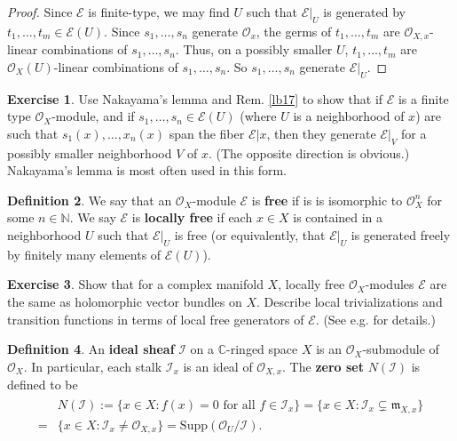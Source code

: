 \documentclass[12pt,b5paper,notitlepage]{report}
\theoremstyle{definition}
\newtheorem{df}{Definition}[section]
\newtheorem{exe}[df]{Exercise}
\theoremstyle{plain}
\newcommand{\fk}{\mathfrak}
\newcommand{\mc}{\mathcal}
\newcommand{\scr}{\mathscr}
\newcommand{\Cbb}{\mathbb C}
\newcommand{\Nbb}{\mathbb N}
\newcommand{\Supp}{\mathrm{Supp}}
\numberwithin{equation}{section}
\begin{document}
\begin{proof}
Since $\scr E$ is finite-type, we may find $U$ such that $\scr E|_U$ is generated by $t_1,\dots,t_m\in\scr E(U)$. Since $s_1,\dots,s_n$ generate $\scr O_x$, the germs of $t_1,\dots,t_m$ are $\scr O_{X,x}$-linear combinations of $s_1,\dots,s_n$. Thus, on a possibly smaller $U$, $t_1,\dots,t_m$ are $\scr O_X(U)$-linear combinations of $s_1,\dots,s_n$. So $s_1,\dots,s_n$ generate $\scr E|_U$.
\end{proof}










\begin{exe}
Use Nakayama's lemma and Rem. \ref{lb17} to show that if $\scr E$ is a finite type $\scr O_X$-module, and if $s_1,\dots,s_n\in\scr E(U)$ (where $U$ is a neighborhood of $x$) are such that $s_1(x),\dots,x_n(x)$ span the fiber $\scr E|x$, then they generate $\scr E|_V$ for a possibly smaller neighborhood $V$ of $x$. (The opposite direction is obvious.) Nakayama's lemma is most often used in this form.
\end{exe}



\begin{df}
We say that an $\scr O_X$-module $\scr E$ is \textbf{free} if is is isomorphic to $\scr O_X^n$ for some $n\in\Nbb$. We say $\scr E$ is \textbf{locally free} if each $x\in X$ is contained in a neighborhood $U$ such that $\scr E|_U$ is free (or equivalently, that $\scr E|_U$ is generated freely by finitely many elements of $\scr E(U)$).
\end{df}

\begin{exe}
Show that for a complex manifold $X$, locally free $\scr O_X$-modules $\scr E$ are the same as holomorphic vector bundles on $X$. Describe local trivializations and transition functions in terms of local free generators of $\scr E$. (See e.g. \cite[Sec. A]{Gui22} for details.)
\end{exe}


\begin{df}
An \textbf{ideal sheaf}  $\mc I$ on a $\Cbb$-ringed space $X$ is an $\scr O_X$-submodule of $\scr O_X$. In particular, each stalk $\mc I_x$ is an ideal of $\scr O_{X,x}$. The \textbf{zero set} $N(\mc I)$ \index{00@Zero set $N(\mc I)$} is defined to be
\begin{align}
\begin{aligned}\label{eq3}
&N(\mc I):=\{x\in X:f(x)=0\text{ for all }f\in\mc I_x\}=\{x\in X:\mc I_x\subsetneq\fk m_{X,x}\}\\
=&\{x\in X:\mc I_x\neq\scr O_{X,x}\}=\Supp(\scr O_U/\mc I).
\end{aligned}
\end{align}
\end{df}
\end{document}
